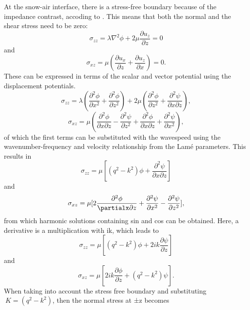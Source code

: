 \documentclass[10pt]{article}
\begin{document}
\begin{itemize}
  At the snow-air interface, there is a stress-free boundary because of the impedance contrast, accoding to \cite{igelComputationalSeismologyPractical2016}. This means that both the normal and the shear stress need to be zero: \begin{equation}
    \sigma_{zz} = \lambda \nabla^2\phi + 2\mu \frac{\partial u_z}{\partial z} = 0
  \end{equation} and \begin{equation}
    \sigma_{xz} = \mu (\frac{\partial u_x}{\partial z} + \frac{\partial u_z}{\partial x}) = 0.
  \end{equation} These can be expressed in terms of the scalar and vector potential using the displacement potentials. \begin{equation}
    \sigma_{zz} = \lambda (\frac{\partial^2 \phi}{\partial x^2} + \frac{\partial^2\phi}{\partial z^2}) + 2\mu (\frac{\partial^2\phi}{\partial z^2} + \frac{\partial^2 \psi}{\partial x \partial z}),
  \end{equation} \begin{equation}
    \sigma_{xz} = \mu (\frac{\partial^2 \phi}{\partial x \partial z} - \frac{\partial^2 \psi }{\partial z^2} + \frac{\partial^2 \phi}{\partial x \partial z} + \frac{\partial^2 \psi}{\partial x^2}),
  \end{equation} of which the first terms can be substituted with the wavespeed using the wavenumber-frequency and velocity relationship from the Lamé parameters. This results in \begin{equation}
    \sigma_{zz} = \mu [(q^2 -k^2) \phi + \frac{\partial^2\psi}{\partial x \partial z}]
  \end{equation} and \begin{equation}
    \sigma_{xz} = \mu [2 \frac{\partial^2 \phi}{\partialx \partial z} + \frac{\partial^2 \psi}{\partial x^2} - \frac{\partial^2 \psi}{\partial z^2}], 
  \end{equation} from which harmonic solutions containing sin and cos can be obtained. Here, a derivative is a multiplication with ik, which leads to \begin{equation}
    \sigma_{zz} = \mu [(q^2- k^2) \phi + 2ik \frac{\partial \psi}{\partial z}]
  \end{equation} and \begin{equation}
    \sigma_{xz} = \mu [2ik \frac{\partial \phi}{\partial z} + (q^2 - k^2)\psi].
  \end{equation} When taking into account the stress free boundary and substituting $\ K = (q^2 - k^2)$, then the normal stress at ±z becomes \begin{equation}

\end{equation}
\end{itemize}
\end{document}

